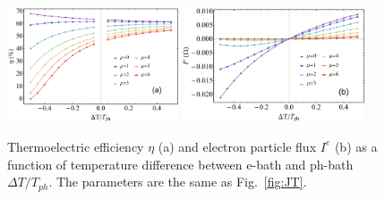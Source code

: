 \documentclass[aps,prb,
,floatfix,footinbib,shortbibliography,
preprint
]{revtex4-1}
\newcommand{\revision}[1]{{\color{blue}{#1}}}
\begin{document}







\begin{figure}[h]


	    \includegraphics[width=0.45\textwidth,angle=0]{figures-0317/fig_4a.pdf}
	    \includegraphics[width=0.48\textwidth,angle=0]{figures-0317/fig_4b.pdf}	
	\caption{Thermoelectric efficiency $\eta$ (a)  and electron particle flux $I^e$ (b) as a function of temperature difference between e-bath and ph-bath $\Delta T/T_{ph}$. The parameters are the same as Fig.~\ref{fig:JT}.   }
	\label{fig:coldspot}
\end{figure}
\end{document}
